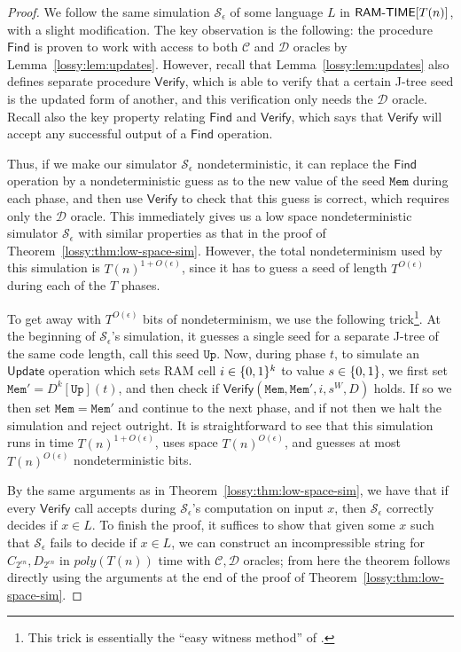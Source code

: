 \begin{proof}
We follow the same simulation $\mathcal{S}_{\epsilon}$ of some language $L$ in $\cl{RAM\dash TIME}[T(n)]$, with a slight modification. The key observation is the following: the procedure $\mathsf{Find}$ is proven to work with access to both $\mathcal{C}$ and $\mathcal{D}$ oracles by Lemma~\ref{lossy:lem:updates}. However, recall that Lemma~\ref{lossy:lem:updates} also defines separate procedure $\mathsf{Verify}$, which is able to verify that a certain J-tree seed is the updated form of another, and this verification only needs the $\mathcal{D}$ oracle. Recall also the key property relating $\mathsf{Find}$ and $\mathsf{Verify}$, which says that $\mathsf{Verify}$ will accept any successful output of a $\mathsf{Find}$ operation.

Thus, if we make our simulator $\mathcal{S}_{\epsilon}$ nondeterministic, it can replace the $\mathsf{Find}$ operation by a nondeterministic guess as to the new value of the seed $\mathtt{Mem}$ during each phase, and then use $\mathsf{Verify}$ to check that this guess is correct, which requires only the $\mathcal{D}$ oracle. This immediately gives us a low space nondeterministic simulator $\mathcal{S}_{\epsilon}$ with similar properties as that in the proof of Theorem~\ref{lossy:thm:low-space-sim}. However, the total nondeterminism used by this simulation is $T(n)^{1 + O(\epsilon)}$, since it has to guess a seed of length $T^{O(\epsilon)}$ during each of the $T$ phases. 

To get away with $T^{O(\epsilon)}$ bits of nondeterminism, we use the following trick\footnote{This trick is essentially the ``easy witness method'' of \cite{Kabenets}.}. At the beginning of $\mathcal{S}_{\epsilon}$'s simulation, it guesses a single seed for a separate J-tree of the same code length, call this seed $\mathtt{Up}$. Now, during phase $t$, to simulate an $\mathsf{Update}$ operation which sets RAM cell $i \in \{0,1\}^k$ to value $s \in \{0,1\}$, we first set $\mathtt{Mem}' = D^k[\mathtt{Up}](t)$, and then check if $\mathsf{Verify}(\mathtt{Mem}, \mathtt{Mem}', i, s^W, D)$ holds. If so we then set $\mathtt{Mem} = \mathtt{Mem}'$ and continue to the next phase, and if not then we halt the simulation and reject outright. It is straightforward to see that this simulation runs in time $T(n)^{1 + O(\epsilon)}$, uses space $T(n)^{O(\epsilon)}$, and guesses at most $T(n)^{O(\epsilon)}$ nondeterministic bits.

By the same arguments as in Theorem~\ref{lossy:thm:low-space-sim}, we have that if every $\mathsf{Verify}$ call accepts during $\mathcal{S}_{\epsilon}$'s computation on input $x$, then $\mathcal{S}_{\epsilon}$ correctly decides if $x \in L$. To finish the proof, it suffices to show that given some $x$ such that $\mathcal{S}_{\epsilon}$ fails to decide if $x \in L$, we can construct an incompressible string for $C_{2^{\epsilon n}}, D_{2^{\epsilon n}}$ in $poly(T(n))$ time with $\mathcal{C}, \mathcal{D}$ oracles; from here the theorem follows directly using the arguments at the end of the proof of Theorem~\ref{lossy:thm:low-space-sim}. 


\end{proof}
